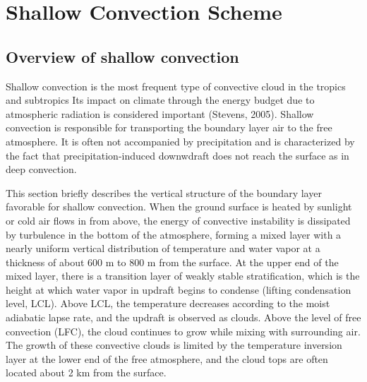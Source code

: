\documentclass[platex, dvipdfmx]{article}
\begin{document}
\hypertarget{shallow-convection-scheme}{%
\section{Shallow Convection Scheme}\label{shallow-convection-scheme}}

\subsection{Overview of shallow convection}\label{overview-of-shallow-convection}
Shallow convection is the most frequent type of convective cloud in the tropics and subtropics Its impact on climate through the energy budget due to atmospheric radiation is considered important (Stevens, 2005).
Shallow convection is responsible for transporting the boundary layer air to the free atmosphere. It is often not accompanied by precipitation and is characterized by the fact that precipitation-induced downwdraft does not reach the surface as in deep convection.

This section briefly describes the vertical structure of the boundary layer favorable for shallow convection.
When the ground surface is heated by sunlight or cold air flows in from above, the energy of convective instability is dissipated by turbulence in the bottom of the atmosphere, forming a mixed layer with a nearly uniform vertical distribution of 
temperature and water vapor at a thickness of about 600 m to 800 m from the surface.
At the upper end of the mixed layer, there is a transition layer of weakly stable stratification, which is the height at which water vapor in updraft begins to condense (lifting condensation level, LCL).
Above LCL, the temperature decreases according to the moist adiabatic lapse rate, and the updraft is observed as clouds. Above the level of free convection (LFC), the cloud continues to grow while mixing with surrounding air. 
The growth of these convective clouds is limited by the temperature inversion layer at the lower end of the free atmosphere, and the cloud tops are often located about 2 km from the surface.
\end{document}
